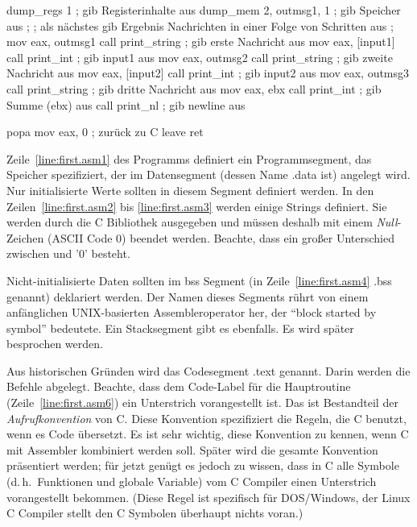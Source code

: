 \begin{AsmCodeListing}[label=first.asm, numbers=left, commandchars=\\\{\}]
         dump_regs 1               ; gib Registerinhalte aus
         dump_mem  2, outmsg1, 1   ; gib Speicher aus
 ;
 ; als n\"{a}chstes gib Ergebnis Nachrichten in einer Folge von Schritten aus
 ;
         mov     eax, outmsg1
         call    print_string      ; gib erste Nachricht aus
         mov     eax, [input1]
         call    print_int         ; gib input1 aus
         mov     eax, outmsg2
         call    print_string      ; gib zweite Nachricht aus
         mov     eax, [input2]
         call    print_int         ; gib input2 aus
         mov     eax, outmsg3
         call    print_string      ; gib dritte Nachricht aus
         mov     eax, ebx
         call    print_int         ; gib Summe (ebx) aus
         call    print_nl          ; gib newline aus

         popa
         mov     eax, 0            ; zur\"{u}ck zu C
         leave
         ret
\end{AsmCodeListing}

Zeile~\ref{line:first.asm1} des Programms definiert ein
Programmsegment, das Speicher spezifiziert, der im Datensegment
(dessen Name {\code .data}  ist) angelegt wird.
Nur initialisierte Werte sollten in diesem Segment definiert werden.
In den Zeilen~\ref{line:first.asm2} bis \ref{line:first.asm3} werden
einige Strings definiert. Sie werden durch die C Bibliothek
ausgegeben und m\"{u}ssen deshalb mit einem \emph{Null}-Zeichen (ASCII
Code 0) beendet werden. Beachte, dass ein gro{\ss}er Unterschied
zwischen {} und {\code '0'} besteht.

Nicht-initialisierte Daten sollten im bss Segment (in
Zeile~\ref{line:first.asm4} {\code .bss} 
genannt) deklariert werden. Der Namen dieses Segments r\"{u}hrt von
einem anf\"{a}nglichen UNIX-basierten Assembleroperator her, der "`block
started by symbol"' bedeutete. Ein Stacksegment gibt es ebenfalls.
Es wird sp\"{a}ter besprochen werden.

Aus historischen Gr\"{u}nden wird das Codesegment 
{\code .text} genannt. Darin werden die Befehle abgelegt. Beachte,
dass dem Code-Label f\"{u}r die Hauptroutine
(Zeile~\ref{line:first.asm6}) ein Unterstrich vorangestellt ist. Das
ist Bestandteil der \emph{Aufrufkonvention}
 von C\@. Diese Konvention spezifiziert
die Regeln, die C benutzt, wenn es Code \"{u}bersetzt. Es ist sehr
wichtig, diese Konvention zu kennen, wenn C mit Assembler kombiniert
werden soll. Sp\"{a}ter wird die gesamte Konvention pr\"{a}sentiert werden;
f\"{u}r jetzt gen\"{u}gt es jedoch zu wissen, dass in C alle Symbole
(d.\,h.\ Funktionen und globale Variable) vom C Compiler einen
Unterstrich vorangestellt bekommen. (Diese Regel ist spezifisch f\"{u}r
DOS/Windows, der Linux C Compiler stellt den C Symbolen \"{u}berhaupt
nichts voran.)

